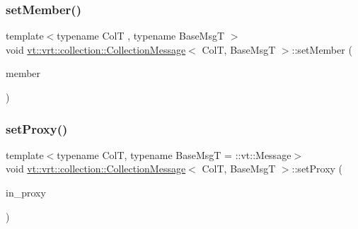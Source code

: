 \subsubsection{\texorpdfstring{set\+Member()}{setMember()}}
{\footnotesize\ttfamily template$<$typename ColT , typename Base\+MsgT $>$ \\
void \hyperlink{structvt_1_1vrt_1_1collection_1_1_collection_message}{vt\+::vrt\+::collection\+::\+Collection\+Message}$<$ ColT, Base\+MsgT $>$\+::set\+Member (\begin{DoxyParamCaption}\item[{bool const \&}]{member }\end{DoxyParamCaption})}

\mbox{\label{structvt_1_1vrt_1_1collection_1_1_collection_message_a38349a148d8dbcab2a4a54efa2089e1c}} 
\subsubsection{\texorpdfstring{set\+Proxy()}{setProxy()}}
{\footnotesize\ttfamily template$<$typename ColT, typename Base\+MsgT = \+::vt\+::\+Message$>$ \\
void \hyperlink{structvt_1_1vrt_1_1collection_1_1_collection_message}{vt\+::vrt\+::collection\+::\+Collection\+Message}$<$ ColT, Base\+MsgT $>$\+::set\+Proxy (\begin{DoxyParamCaption}\item[{\hyperlink{namespacevt_1_1vrt_a620a5c8c59d13e513f690c74b4af516f}{Virtual\+Elm\+Proxy\+Type}$<$ ColT, \hyperlink{structvt_1_1vrt_1_1collection_1_1_collection_message_a324978c38e67d1bfa86c8db172e77594}{Index\+Type} $>$ const \&}]{in\+\_\+proxy }\end{DoxyParamCaption})}

\mbox{\label{structvt_1_1vrt_1_1collection_1_1_collection_message_aa6986dc4ba8ac540311a882bef86e80c}} 
